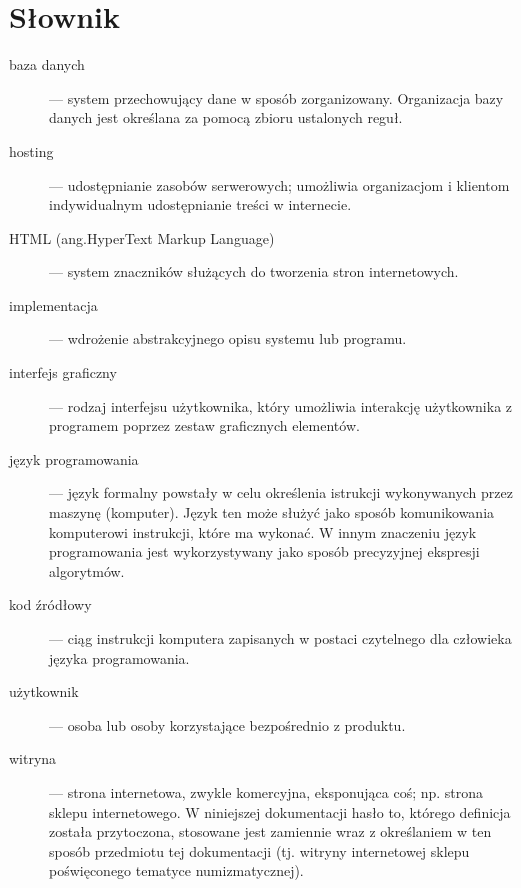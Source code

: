 \documentclass [11pt, a4paper, leqno]	{article}				%
\begin{document}
\section{Słownik}
\begin{description}

 \item[baza danych] --- system przechowujący dane w sposób zorganizowany. Organizacja bazy danych jest określana za pomocą zbioru ustalonych reguł. 

\item[hosting] --- udostępnianie zasobów serwerowych; umożliwia organizacjom i klientom indywidualnym udostępnianie treści w internecie.

\item[HTML (ang.HyperText Markup Language)] ---  system znaczników służących do tworzenia stron internetowych.

\item[implementacja] --- wdrożenie abstrakcyjnego opisu systemu lub programu.

\item[interfejs graficzny] --- rodzaj interfejsu użytkownika, który umożliwia interakcję użytkownika z programem poprzez zestaw graficznych elementów.

\item[język programowania] --- język formalny powstały w celu określenia istrukcji wykonywanych przez maszynę (komputer). 
Język ten może służyć jako sposób komunikowania komputerowi instrukcji, które ma wykonać. W innym znaczeniu język programowania jest wykorzystywany jako sposób precyzyjnej ekspresji algorytmów.

\item[kod źródłowy] --- ciąg instrukcji komputera zapisanych w postaci czytelnego dla człowieka języka programowania. 

\item[użytkownik] --- osoba lub osoby korzystające bezpośrednio z produktu.

\item[witryna] --- strona internetowa, zwykle komercyjna, eksponująca coś; np. strona sklepu internetowego. W niniejszej dokumentacji hasło to, którego definicja została przytoczona, stosowane jest zamiennie wraz z określaniem w ten sposób przedmiotu tej dokumentacji (tj. witryny internetowej sklepu poświęconego tematyce numizmatycznej).


\end{description}
\end{document}
